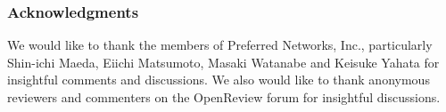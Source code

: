 \subsubsection*{Acknowledgments}
 We would like to thank the members of Preferred Networks, Inc., particularly Shin-ichi Maeda, Eiichi Matsumoto, Masaki Watanabe and Keisuke Yahata for insightful comments and discussions. We also would like to thank anonymous reviewers and commenters on the OpenReview forum for insightful discussions.


